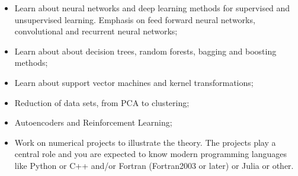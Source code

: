 \documentclass{beamer}
\begin{document}
\begin{frame}
\begin{block}{}
\begin{itemize}
\item Learn about neural networks and deep  learning methods for supervised and unsupervised learning. Emphasis on feed forward neural networks, convolutional and recurrent neural networks; 

\item Learn about about decision trees, random forests, bagging and boosting methods;

\item Learn about support vector machines and kernel transformations;

\item Reduction of data sets, from PCA to clustering;

\item Autoencoders and Reinforcement Learning;

\item Work on numerical projects to illustrate the theory. The projects play a central role and you are expected to know modern programming languages like Python or C++ and/or Fortran (Fortran2003 or later) or Julia or other.
\end{itemize}

\noindent
\end{block}
\end{frame}
\end{document}
